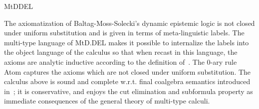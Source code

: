 \begin{entry}{MtDDEL}
\begin{technicalities}
  The axiomatization of Baltag-Moss-Solecki's dynamic epistemic logic is not
  closed under uniform substitution and is given in terms of meta-linguistic
  labels. The multi-type language of MtD.DEL makes it possible to internalize the
  labels into the object language of the calculus so that when recast in this
  language, the axioms are analytic inductive according to the definition
  of~\cite{GrecoMaPalmigianoTzimoulisZhao2016}. The $0$-ary rule Atom captures the
  axioms which are not closed under uniform substitution.  The calculus above is
  sound and complete w.r.t. final coalgebra semantics introduced
  in~\cite{GrecoKurzPalmigiano2013}; it is conservative, and enjoys the cut
  elimination and subformula property as immediate consequences of the general
  theory of multi-type calculi.
\end{technicalities}

\end{entry}
